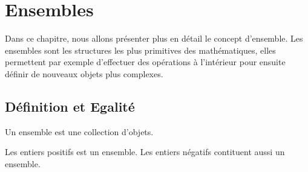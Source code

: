 \chapter{Ensembles}

\justify
\setlength{\parindent}{0pt}


Dans ce chapitre, nous allons présenter plus en détail le concept d'ensemble. 
Les ensembles sont les structures les plus primitives des mathématiques, elles permettent par exemple d'effectuer des opérations 
à l'intérieur pour ensuite définir de nouveaux objets plus complexes. 


\section{Définition et Egalité}

\begin{definition}[Ensemble]
    Un ensemble est une collection d'objets. 
\end{definition}

\begin{example}
    Les entiers positifs est un ensemble. Les entiers négatifs contituent aussi un ensemble. 
\end{example}


